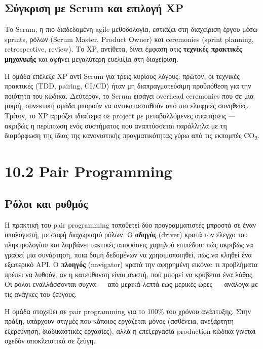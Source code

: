 \subsection{Σύγκριση με Scrum και επιλογή
XP}\label{ux3c3ux3cdux3b3ux3baux3c1ux3b9ux3c3ux3b7-ux3bcux3b5-scrum-ux3baux3b1ux3b9-ux3b5ux3c0ux3b9ux3bbux3bfux3b3ux3ae-xp}

Το Scrum, η πιο διαδεδομένη agile μεθοδολογία, εστιάζει στη διαχείριση
έργου μέσω sprints, ρόλων (Scrum Master, Product Owner) και ceremonies
(sprint planning, retrospective, review). Το XP, αντίθετα, δίνει έμφαση
στις \textbf{τεχνικές πρακτικές μηχανικής} και αφήνει μεγαλύτερη
ευελιξία στη διαχείριση.

Η ομάδα επέλεξε XP αντί Scrum για τρεις κυρίους λόγους: πρώτον, οι
τεχνικές πρακτικές (TDD, pairing, CI/CD) ήταν μη διαπραγματεύσιμη
προϋπόθεση για την ποιότητα του κώδικα. Δεύτερον, το Scrum εισάγει
overhead ceremonies που σε μια μικρή, συνεκτική ομάδα μπορούν να
αντικατασταθούν από πιο ελαφριές συνηθείες. Τρίτον, το XP αρμόζει
ιδιαίτερα σε project με μεταβαλλόμενες απαιτήσεις --- ακριβώς η
περίπτωση ενός συστήματος που αναπτύσσεται παράλληλα με τη διαμόρφωση
της ίδιας της κανονιστικής πραγματικότητας γύρω από τις εκπομπές
CO\textsubscript{2}.

\section{10.2 Pair Programming}\label{pair-programming}

\subsection{Ρόλοι και
ρυθμός}\label{ux3c1ux3ccux3bbux3bfux3b9-ux3baux3b1ux3b9-ux3c1ux3c5ux3b8ux3bcux3ccux3c2}

Η πρακτική του pair programming τοποθετεί δύο προγραμματιστές μπροστά σε
έναν υπολογιστή, με σαφή διαχωρισμό ρόλων. Ο \textbf{οδηγός} (driver)
κρατά τον έλεγχο του πληκτρολογίου και λαμβάνει τακτικές αποφάσεις
χαμηλού επιπέδου: πώς ακριβώς να γραφεί μια συνάρτηση, ποια δομή
δεδομένων να χρησιμοποιηθεί, πώς να κληθεί ένα εξωτερικό API. Ο
\textbf{πλοηγός} (navigator) κρατά την αφηρημένη εικόνα: τι προβλήματα
πρέπει να λυθούν, αν η κατεύθυνση είναι σωστή, πού μπορεί να κρύβεται
ένα λάθος. Οι ρόλοι εναλλάσσονται συχνά --- από μερικά λεπτά εώς μερικές
ώρες --- ανάλογα με τις ανάγκες του ζεύγους.

Η ομάδα στοχεύει σε pair programming για το 100\% του χρόνου ανάπτυξης.
Στην πράξη, υπάρχουν στιγμές που κάποιος εργάζεται μόνος (ασθένεια,
ανεξάρτητη εξερεύνηση, διαδικαστικές εργασίες), αλλά η επεξεργασία
production κώδικα γίνεται σχεδόν αποκλειστικά σε ζεύγη.

